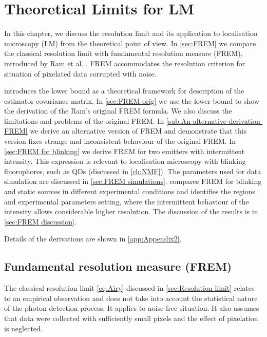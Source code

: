 \chapter{Theoretical Limits for LM \label{ch:Theoretical-limits-of the LM}}

In this chapter, we discuss the resolution limit and its application to localisation microscopy (LM) from the theoretical point of view. In \autoref{sec:FREM} we compare the classical resolution limit with fundamental resolution measure (FREM), introduced by Ram et al. \cite{Ram2006}. FREM accommodates the resolution criterion for situation of pixelated data corrupted with noise.

 introduces the \CR lower bound as a theoretical framework for description of the estimator covariance matrix. In \autoref{sec:FREM orig} we use the \CR lower bound to show the derivation of the Ram's original FREM formula. We also discuss the limitations and problems of the original FREM. In \autoref{sub:An-alternative-derivation-FREM} we derive an alternative version of FREM and demonstrate that this version fixes strange and inconsistent behaviour of the original FREM. In \autoref{sec:FREM for blinking} we derive FREM for two emitters with intermittent intensity. This expression is relevant to localisation microscopy with blinking fluorophores, such as QDs (discussed in \autoref{ch:NMF}). The parameters used for data simulation are discussed in \autoref{sec:FREM simulations}.  compares FREM for blinking and static sources in different experimental conditions and identifies the regions and experimental parameters setting, where the intermittent behaviour of the intensity allows considerable higher resolution. The discussion of the results is in \autoref{sec:FREM discussion}. 

Details of the derivations are shown in \autoref{app:Appendix2}.


\section{Fundamental resolution measure (FREM)\label{sec:FREM}}

The classical resolution limit \autoref{eq:Airy} discussed in \autoref{sec:Resolution limit} relates to an empirical observation and does not take into account the statistical nature of the photon detection process. It applies to noise-free situation. It also assumes that data were collected with sufficiently small pixels and the effect of pixelation is neglected. 


